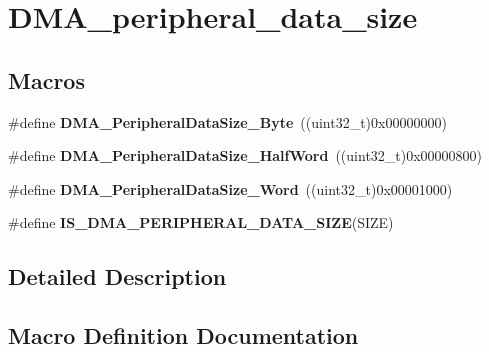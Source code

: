 \hypertarget{group___d_m_a__peripheral__data__size}{}\section{D\+M\+A\+\_\+peripheral\+\_\+data\+\_\+size}
\label{group___d_m_a__peripheral__data__size}
\subsection*{Macros}
\begin{DoxyCompactItemize}
\item 
\hypertarget{group___d_m_a__peripheral__data__size_ga7577035ae4ff413164000227a8cea346}{}\#define {\bfseries D\+M\+A\+\_\+\+Peripheral\+Data\+Size\+\_\+\+Byte}~((uint32\+\_\+t)0x00000000)\label{group___d_m_a__peripheral__data__size_ga7577035ae4ff413164000227a8cea346}

\item 
\hypertarget{group___d_m_a__peripheral__data__size_gab1988e5005ee65c261018f62866e4585}{}\#define {\bfseries D\+M\+A\+\_\+\+Peripheral\+Data\+Size\+\_\+\+Half\+Word}~((uint32\+\_\+t)0x00000800)\label{group___d_m_a__peripheral__data__size_gab1988e5005ee65c261018f62866e4585}

\item 
\hypertarget{group___d_m_a__peripheral__data__size_ga516ea7a40945d8325fe73e079b245ea1}{}\#define {\bfseries D\+M\+A\+\_\+\+Peripheral\+Data\+Size\+\_\+\+Word}~((uint32\+\_\+t)0x00001000)\label{group___d_m_a__peripheral__data__size_ga516ea7a40945d8325fe73e079b245ea1}

\item 
\#define {\bfseries I\+S\+\_\+\+D\+M\+A\+\_\+\+P\+E\+R\+I\+P\+H\+E\+R\+A\+L\+\_\+\+D\+A\+T\+A\+\_\+\+S\+I\+Z\+E}(S\+I\+Z\+E)
\end{DoxyCompactItemize}


\subsection{Detailed Description}


\subsection{Macro Definition Documentation}
\hypertarget{group___d_m_a__peripheral__data__size_gad7916e0ae55cdf5efdfa68a09a028037}{}
